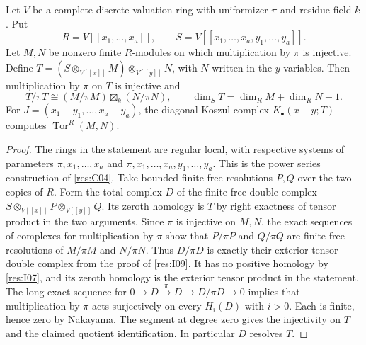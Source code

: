 \begin{lemma}\label{res:I11}
Let \(V\) be a complete discrete valuation ring with uniformizer
\(\pi\) and residue field \(k\). Put
\[
 R=V[[x_1,\ldots,x_a]],\qquad
 S=V[[x_1,\ldots,x_a,y_1,\ldots,y_a]] .
\]
Let \(M,N\) be nonzero finite \(R\)-modules on which multiplication
by \(\pi\) is injective. Define \(T=(S\otimes_{V[[x]]}M)
\otimes_{V[[y]]}N\), with \(N\) written in the \(y\)-variables.
Then multiplication by \(\pi\) on \(T\) is injective and
\[
 T/\pi T\cong (M/\pi M)\boxtimes_k(N/\pi N),\qquad
 \dim_S T=\dim_R M+\dim_R N-1 .
\]
For \(J=(x_1-y_1,\ldots,x_a-y_a)\), the diagonal Koszul complex
\(K_\bullet(x-y;T)\) computes \(\operatorname{Tor}^R(M,N)\).
\end{lemma}
\begin{proof}
The rings in the statement are regular local, with respective
systems of parameters \(\pi,x_1,\ldots,x_a\) and
\(\pi,x_1,\ldots,x_a,y_1,\ldots,y_a\). This is the power series
construction of \ref{res:C04}. Take bounded finite free resolutions
\(P,Q\) over the two copies of \(R\). Form the total complex \(D\) of
the finite free double complex
\(S\otimes_{V[[x]]}P\otimes_{V[[y]]}Q\). Its zeroth homology is
\(T\) by right exactness of tensor product in the two arguments.
Since \(\pi\) is injective on \(M,N\), the exact sequences of
complexes for multiplication by \(\pi\) show that \(P/\pi P\)
and \(Q/\pi Q\) are finite free resolutions of \(M/\pi M\)
and \(N/\pi N\). Thus \(D/\pi D\) is exactly their exterior tensor
double complex from the proof of \ref{res:I09}.
It has no positive homology by \ref{res:I07}, and its zeroth
homology is the exterior tensor product in the statement.
The long exact sequence for
\(0\to D\xrightarrow{\pi}D\to D/\pi D\to0\) implies
that multiplication by \(\pi\) acts surjectively on every
\(H_i(D)\) with \(i>0\). Each is finite, hence zero by Nakayama.
The segment at degree zero gives the injectivity on \(T\)
and the claimed quotient identification. In particular \(D\)
resolves \(T\).


\end{proof}
